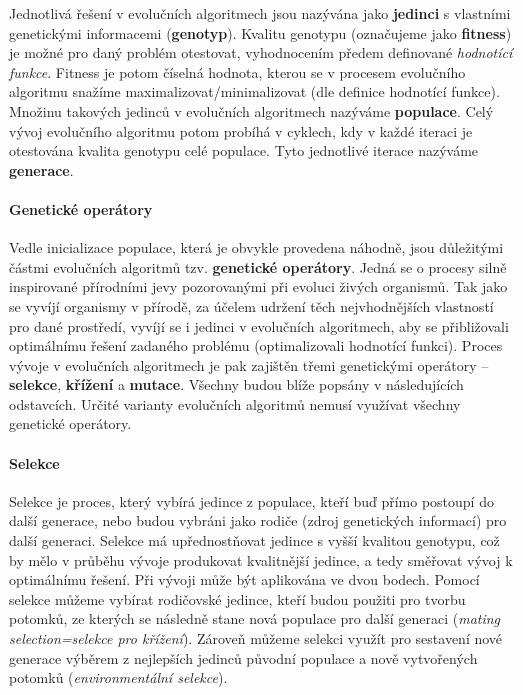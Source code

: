 Jednotlivá řešení v evolučních algoritmech jsou nazývána jako \textbf{jedinci}
s vlastními genetickými informacemi (\textbf{genotyp}). Kvalitu genotypu
(označujeme jako \textbf{fitness}) je možné pro daný problém otestovat,
vyhodnocením předem definované \emph{hodnotící funkce}. Fitness je potom číselná
hodnota, kterou se v procesem evolučního algoritmu snažíme
maximalizovat/minimalizovat (dle definice hodnotící funkce). Množinu takových
jedinců v evolučních algoritmech nazýváme \textbf{populace}. Celý vývoj
evolučního algoritmu potom probíhá v cyklech, kdy v každé iteraci je otestována
kvalita genotypu celé populace. Tyto jednotlivé iterace nazýváme
\textbf{generace}.

\paragraph{Genetické operátory} \label{Evoluční algoritmy - operátory}
Vedle inicializace populace, která je obvykle provedena náhodně, jsou
důležitými částmi evolučních algoritmů tzv. \textbf{genetické operátory}. Jedná
se o procesy silně inspirované přírodními jevy pozorovanými při evoluci živých
organismů. Tak jako se vyvíjí organismy v přírodě, za účelem udržení těch
nejvhodnějších vlastností pro dané prostředí, vyvíjí se i jedinci v evolučních
algoritmech, aby se přibližovali optimálnímu řešení zadaného problému
(optimalizovali hodnotící funkci). Proces vývoje v evolučních algoritmech je
pak zajištěn třemi genetickými operátory -- \textbf{selekce}, \textbf{křížení}
a \textbf{mutace}. Všechny budou blíže popsány v následujících odstavcích.
Určité varianty evolučních algoritmů nemusí využívat všechny genetické
operátory.

\paragraph{Selekce}
Selekce je proces, který vybírá jedince z populace, kteří buď přímo postoupí do
další generace, nebo budou vybráni jako rodiče (zdroj genetických informací)
pro další generaci. Selekce má upřednostňovat jedince s vyšší kvalitou
genotypu, což by mělo v průběhu vývoje produkovat kvalitnější jedince, a tedy
směřovat vývoj k optimálnímu řešení. Při vývoji může být aplikována ve dvou
bodech. Pomocí selekce můžeme vybírat rodičovské jedince, kteří budou použiti
pro tvorbu potomků, ze kterých se následně stane nová populace pro další
generaci (\emph{mating selection=selekce pro křížení}). Zároveň můžeme selekci
využít pro sestavení nové generace výběrem z nejlepších jedinců původní
populace a nově vytvořených potomků (\emph{environmentální selekce}).

